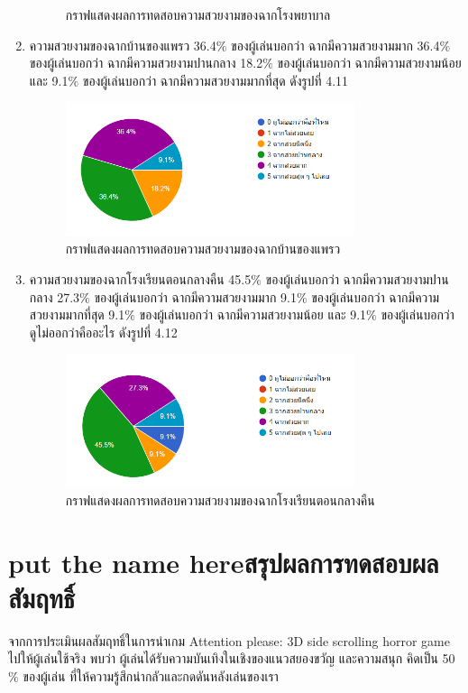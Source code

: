 \begin{enumerate}
\begin{figure}
        \caption[กราฟแสดงผลการทดสอบความสวยงามของฉากโรงพยาบาล]{กราฟแสดงผลการทดสอบความสวยงามของฉากโรงพยาบาล}
    \end{figure}
    \item ความสวยงามของฉากบ้านของแพรว 36.4$\%$ ของผู้เล่นบอกว่า ฉากมีความสวยงามมาก 36.4$\%$ ของผู้เล่นบอกว่า ฉากมีความสวยงามปานกลาง 18.2$\%$ ของผู้เล่นบอกว่า ฉากมีความสวยงามน้อย และ 9.1$\%$ ของผู้เล่นบอกว่า ฉากมีความสวยงามมากที่สุด ดังรูปที่ 4.11
    \begin{figure}
        \centering
        \includegraphics[width=0.8\textwidth, height=0.20\textheight]{Images/Graph Home.png}
        \caption[กราฟแสดงผลการทดสอบความสวยงามของฉากบ้านของแพรว]{กราฟแสดงผลการทดสอบความสวยงามของฉากบ้านของแพรว}
    \end{figure}
    \item ความสวยงามของฉากโรงเรียนตอนกลางคืน 45.5$\%$ ของผู้เล่นบอกว่า ฉากมีความสวยงามปานกลาง 27.3$\%$ ของผู้เล่นบอกว่า ฉากมีความสวยงามมาก 9.1$\%$ ของผู้เล่นบอกว่า ฉากมีความสวยงามมากที่สุด 9.1$\%$ ของผู้เล่นบอกว่า ฉากมีความสวยงามน้อย และ 9.1$\%$ ของผู้เล่นบอกว่า ดูไม่ออกว่าคืออะไร ดังรูปที่ 4.12
    \begin{figure}
        \centering
        \includegraphics[width=0.8\textwidth, height=0.20\textheight]{Images/Graph School Night.png}
        \caption[กราฟแสดงผลการทดสอบความสวยงามของฉากโรงเรียนตอนกลางคืน]{กราฟแสดงผลการทดสอบความสวยงามของฉากโรงเรียนตอนกลางคืน}
    \end{figure}
\end{enumerate}

\section{\ifenglish put the name here\else สรุปผลการทดสอบผลสัมฤทธิ์\fi}
จากการประเมินผลสัมฤทธิ์ในการนำเกม Attention please: 3D side scrolling horror game ไปให้ผู้เล่นใช้จริง พบว่า ผู้เล่นได้รับความบันเทิงในเชิงของแนวสยองขวัญ และความสนุก คิดเป็น 50$\%$ ของผู้เล่น ที่ให้ความรู้สึกน่ากลัวและกดดันหลังเล่นของเรา
